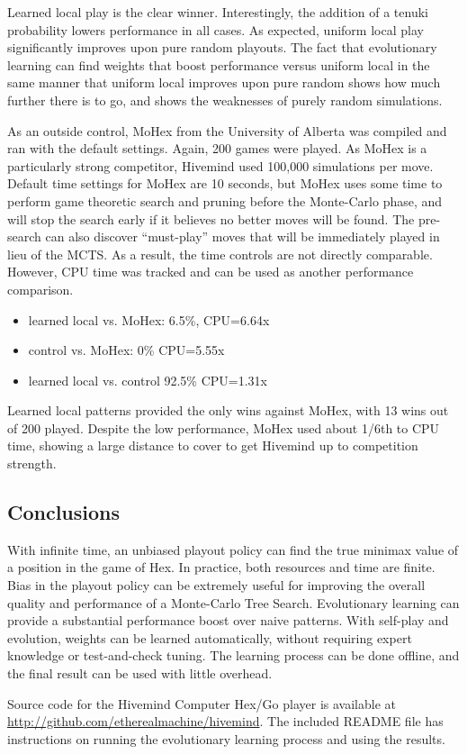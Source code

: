 \documentclass[11pt]{report}
\begin{document}
Learned local play is the clear winner. Interestingly, the addition of a tenuki probability lowers performance in all cases. As expected, uniform local play significantly improves upon pure random playouts. The fact that evolutionary learning can find weights that boost performance versus uniform local in the same manner that uniform local improves upon pure random shows how much further there is to go, and shows the weaknesses of purely random simulations.

As an outside control, MoHex from the University of Alberta was compiled and ran with the default settings\cite{mohex}. Again, 200 games were played. As MoHex is a particularly strong competitor, Hivemind used 100,000 simulations per move. Default time settings for MoHex are 10 seconds, but MoHex uses some time to perform game theoretic search and pruning before the Monte-Carlo phase, and will stop the search early if it believes no better moves will be found. The pre-search can also discover ``must-play'' moves that will be immediately played in lieu of the MCTS. As a result, the time controls are not directly comparable. However, CPU time was tracked and can be used as another performance comparison.

\begin{itemize}
\item learned local vs. MoHex: 6.5\%, CPU=6.64x
\item control vs. MoHex: 0\% CPU=5.55x
\item learned local vs. control 92.5\% CPU=1.31x
\end{itemize}

Learned local patterns provided the only wins against MoHex, with 13 wins out of 200 played. Despite the low performance, MoHex used about 1/6th to CPU time, showing a large distance to cover to get Hivemind up to competition strength.

\subsection{Conclusions}
With infinite time, an unbiased playout policy can find the true minimax value of a position in the game of Hex. In practice, both resources and time are finite. Bias in the playout policy can be extremely useful for improving the overall quality and performance of a Monte-Carlo Tree Search. Evolutionary learning can provide a substantial performance boost over naive patterns. With self-play and evolution, weights can be learned automatically, without requiring expert knowledge or test-and-check tuning. The learning process can be done offline, and the final result can be used with little overhead.

Source code for the Hivemind Computer Hex/Go player is available at \url{http://github.com/etherealmachine/hivemind}. The included README file has instructions on running the evolutionary learning process and using the results.



\end{document}
